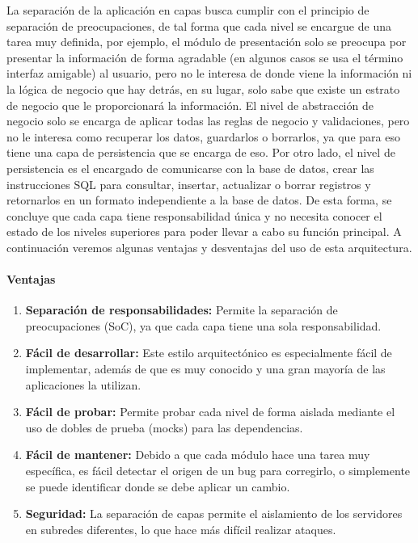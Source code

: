 La separación de la aplicación en capas busca cumplir con el principio de separación de 
preocupaciones\cite{separation}, de tal forma que cada nivel se encargue de una tarea muy definida, por ejemplo,
el m\'odulo de presentación solo se preocupa por presentar la información de forma agradable (en algunos casos se usa el t\'ermino interfaz amigable)
al usuario, pero no le interesa de donde viene la información ni la lógica de negocio que 
hay detrás, en su lugar, solo sabe que existe un estrato de negocio que le proporcionará la 
información. El nivel de abstracci\'on de negocio solo se encarga de aplicar todas las 
reglas de negocio y validaciones, pero no le interesa como recuperar los datos, guardarlos
o borrarlos, ya que para eso tiene una capa de persistencia que se encarga de eso. 
Por otro lado, el nivel de persistencia es el encargado de comunicarse con la base de datos,
crear las instrucciones SQL para consultar, insertar, actualizar o borrar registros 
y retornarlos en un formato independiente a la base de datos. De esta forma, se 
concluye que cada capa tiene responsabilidad \'unica y no necesita conocer el estado
de los niveles superiores para poder llevar a cabo su funci\'on principal. 
A continuaci\'on veremos algunas ventajas y desventajas del uso de esta arquitectura.

\paragraph{Ventajas}
\begin{enumerate}
    \item \textbf{Separación de responsabilidades:} Permite la separación de preocupaciones (SoC), ya que cada capa tiene una sola responsabilidad.
    \item \textbf{Fácil de desarrollar:} Este estilo arquitectónico es especialmente fácil de implementar, además de que es muy conocido y una gran mayoría de las aplicaciones la utilizan.
    \item \textbf{Fácil de probar:} Permite probar cada nivel de forma aislada mediante el uso de dobles de prueba (mocks)\cite{mock} para las dependencias.
    \item \textbf{Fácil de mantener:} Debido a que cada m\'odulo hace una tarea muy específica, es fácil detectar el origen de un bug para corregirlo, o simplemente se puede identificar donde se debe aplicar un cambio.
    \item \textbf{Seguridad:} La separación de capas permite el aislamiento de los servidores en subredes diferentes, lo que hace más difícil realizar ataques.
\end{enumerate}


